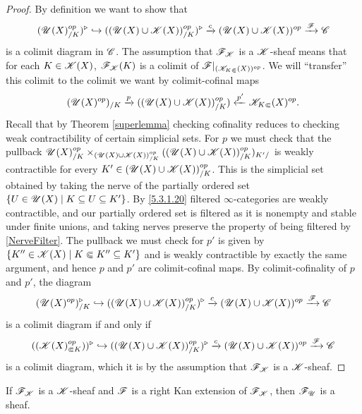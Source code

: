 \documentclass[../../thesis.tex]{subfiles}
\begin{document}
\begin{proof}
    By definition we want to show that
    \[
        (\mathscr{U}(X)_{/K}^{op})^{\triangleright} \hookrightarrow ((\mathscr{U}(X)\cup \mathscr{K}(X))_{/K}^{op})^{\triangleright} \xrightarrow{c}(\mathscr{U}(X) \cup \mathscr{K}(X))^{op}\xrightarrow{\mathscr{F}}\mathscr{C}
    \]
    is a colimit diagram in $\mathscr{C}$.
    The assumption that $\mathscr{F}_{\mathscr{K}}$ is a $\mathscr{K}$-sheaf means that for each $K\in \mathscr{K}(X)$, $\mathscr{F}_{\mathscr{K}}(K)$ is a colimit of $\mathscr{F}|_{(\mathscr{K}_{K\Subset}(X))^{op}}$.
    We will ``transfer'' this colimit to the colimit we want by colimit-cofinal maps
    \[
        (\mathscr{U}(X)^{op})_{/K} \xrightarrow{p} ((\mathscr{U}(X)\cup \mathscr{K}(X))_{/K}^{op}) \xleftarrow{p'}\mathscr{K}_{K\Subset}(X)^{op}.
    \]
    Recall that by Theorem \ref{superlemma} checking cofinality reduces to checking weak contractibility of certain simplicial sets.
    For $p$ we must check that the pullback $\mathscr{U}(X)^{op}_{/K} \times_{(\mathscr{U}(X)\cup \mathscr{K}(X))_{/K}^{op}} ((\mathscr{U}(X)\cup \mathscr{K}(X))_{/K}^{op})_{K'/}$ is weakly contractible for every $K' \in (\mathscr{U}(X)\cup \mathscr{K}(X))_{/K}^{op}$.
    This is the simplicial set obtained by taking the nerve of the partially ordered set $\{U \in \mathscr{U}(X) \mid K\subseteq U \subseteq K'\}$.
    By \ref{5.3.1.20} filtered $\infty$-categories are weakly contractible, and our partially ordered set is filtered as it is nonempty and stable under finite unions, and taking nerves preserve the property of being filtered by \ref{NerveFilter}.
    The pullback we must check for $p'$ is given by $\{K'' \in \mathscr{K}(X) \mid K \Subset K'' \subseteq K'\}$ and is weakly contractible by exactly the same argument, and hence $p$ and $p'$ are colimit-cofinal maps.
    By colimit-cofinality of $p$ and $p'$, the diagram
    \[
        (\mathscr{U}(X)^{op})^{\triangleright}_{/K} \hookrightarrow ((\mathscr{U}(X)\cup \mathscr{K}(X))_{/K}^{op})^{\triangleright} \xrightarrow{c}(\mathscr{U}(X) \cup \mathscr{K}(X))^{op}\xrightarrow{\mathscr{F}}\mathscr{C}
    \]
    is a colimit diagram if and only if
    \[
        ((\mathscr{K}(X)^{op}_{\Subset K}))^{\triangleright} \hookrightarrow ((\mathscr{U}(X)\cup \mathscr{K}(X))_{/K}^{op})^{\triangleright} \xrightarrow{c}(\mathscr{U}(X) \cup \mathscr{K}(X))^{op}\xrightarrow{\mathscr{F}}\mathscr{C}
    \]
    is a colimit diagram, which it is by the assumption that $\mathscr{F}_{\mathscr{K}}$ is a $\mathscr{K}$-sheaf.
\end{proof}
\begin{lemma}\label{lemmaFuSheaf}
    If $\mathscr{F}_{\mathscr{K}}$ is a $\mathscr{K}$-sheaf and $\mathscr{F}$ is a right Kan extension of $\mathscr{F}_{\mathscr{K}}$, then $\mathscr{F}_{\mathscr{U}}$ is a sheaf.
\end{lemma}
\end{document}
